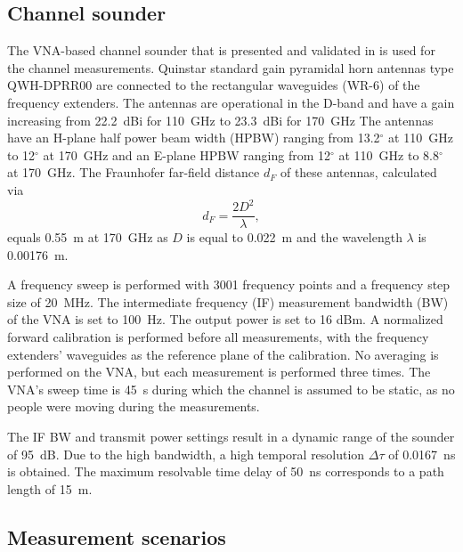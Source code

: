 \documentclass[preprint]{rsl}
\begin{document}
\subsection{Channel sounder}

The VNA-based channel sounder that is presented and validated in \cite{DeBeelde2021_eucap} is used for the channel measurements.
Quinstar standard gain pyramidal horn antennas type QWH-DPRR00 are connected to the rectangular waveguides (WR-6) of the frequency extenders. 
The antennas are operational in the D-band and have a gain increasing from 22.2~dBi for 110~GHz to 23.3~dBi for 170~GHz
The antennas have an H-plane half power beam width (HPBW) ranging from 13.2$^{\circ}$ at 110~GHz to 12$^{\circ}$ at 170~GHz and an E-plane HPBW ranging from 12$^{\circ}$ at 110~GHz to 8.8$^{\circ}$ at 170~GHz. 
The Fraunhofer far-field distance $d_F$ of these antennas, calculated via
\begin{equation}
\label{eq:Fraunhofer}
d_F = \frac{2 D^2}{\lambda}, 
\end{equation}
equals 0.55~m at 170~GHz as $D$ is equal to 0.022~m and the wavelength $\lambda$ is 0.00176~m.

A frequency sweep is performed with 3001 frequency points and a frequency step size of 20~MHz. 
The intermediate frequency (IF) measurement bandwidth (BW) of the VNA is set to 100~Hz. 
The output power is set to 16 dBm.
A normalized forward calibration is performed before all measurements, with the frequency extenders' waveguides as the reference plane of the calibration. 
No averaging is performed on the VNA, but each measurement is performed three times.
The VNA's sweep time is 45~s during which the channel is assumed to be static, as no people were moving during the measurements. 

The IF BW and transmit power settings result in a dynamic range of the sounder of 95~dB.
Due to the high bandwidth, a high temporal resolution $\Delta\tau$ of 0.0167~ns is obtained.
The maximum resolvable time delay of 50~ns corresponds to a path length of 15~m.

\subsection{Measurement scenarios}
\end{document}
